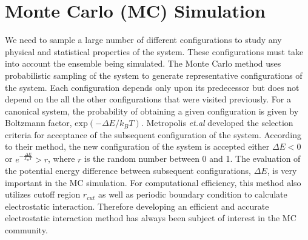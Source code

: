 \section{Monte Carlo (MC) Simulation}
We need to sample a large number of different configurations to study any physical and statistical properties of the system. These configurations must take into account the ensemble being simulated. The Monte Carlo method uses probabilistic sampling of the system to generate representative configurations of the system. Each configuration depends only upon its predecessor but does not depend on the all the other configurations that were visited previously. For a canonical system, the probability of obtaining a given configuration is given by Boltzmann factor, $\mathrm{exp}(-{\Delta E}/{k_B T})$. Metropolis \textit{et.al} developed the selection criteria for acceptance of the subsequent configuration of the system. \cite{Metropolis53} According to their method, the new configuration of the system is accepted either  $\Delta E < 0$ or  $e^{-\frac{\Delta E}{k_B T}} > r$, where $r$ is the random number between 0 and 1. The evaluation of the potential energy difference between subsequent configurations, $\Delta E$, is very important in the MC simulation. For computational efficiency, this method also utilizes cutoff region $r_{cut}$ as well as periodic boundary condition to calculate electrostatic interaction. Therefore developing an efficient and accurate electrostatic interaction method has always been subject of interest in the MC community. 

